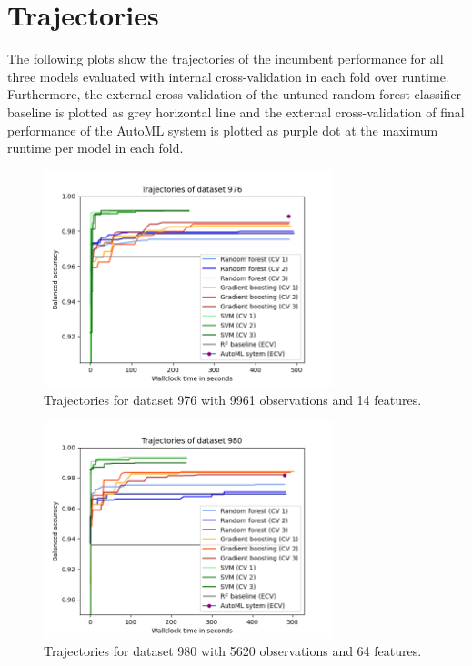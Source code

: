 \documentclass[11pt]{article}
\begin{document}



\newpage
\appendix

\section{Trajectories}

The following plots show the trajectories of the incumbent performance for all three models evaluated with internal cross-validation in each fold over runtime. Furthermore, the external cross-validation of the untuned random forest classifier baseline is plotted as grey horizontal line and the external cross-validation of final performance of the AutoML system is plotted as purple dot at the maximum runtime per model in each fold.

\begin{figure}[H]
 \centering
  \includegraphics[width=0.75\textwidth]{fig/plot_dataset_976.png}
  \caption{Trajectories for dataset 976 with 9961 observations and 14 features.}
\end{figure}

\begin{figure}[H]
 \centering
  \includegraphics[width=0.75\textwidth]{fig/plot_dataset_980.png}
  \caption{Trajectories for dataset 980 with 5620 observations and 64 features.}
\end{figure}
\end{document}
